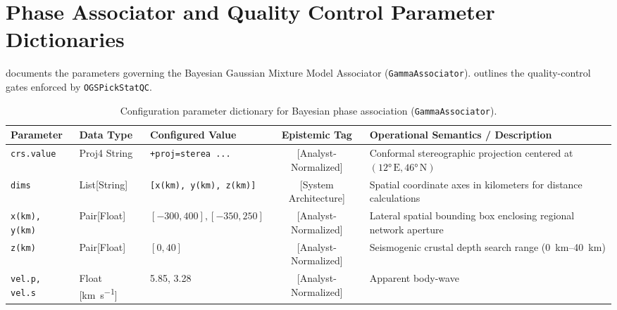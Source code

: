 \section{Phase Associator and Quality Control Parameter Dictionaries}
\label{sec:app_assoc_qc_params}

 documents the parameters
governing the Bayesian Gaussian Mixture Model Associator
(\texttt{GammaAssociator}). 
outlines the quality-control gates enforced by \texttt{OGSPickStatQC}.

\begin{landscape}
  \begin{table}[htbp]
    \centering
    \small
    \caption{Configuration parameter dictionary for Bayesian phase
    association (\texttt{GammaAssociator}).}
    \label{tab:app_gamma_dictionary}
    \begin{threeparttable}
      \begin{tabularx}{\linewidth}{l l l c >{\raggedright\arraybackslash}X}
        \toprule
        \textbf{Parameter} & \textbf{Data Type} & \textbf{Configured
        Value} & \textbf{Epistemic Tag} & \textbf{Operational
        Semantics / Description} \\
        \midrule
        \texttt{crs.value} & Proj4 String & \texttt{+proj=sterea ...}
        & [Analyst-Normalized] & Conformal stereographic projection
        centered at $(\ang{12}\,\mathrm{E}, \ang{46}\,\mathrm{N})$ \\
        \texttt{dims} & List[String] & \texttt{[x(km), y(km), z(km)]}
        & [System Architecture] & Spatial coordinate axes in
        kilometers for distance calculations \\
        \texttt{x(km), y(km)} & Pair[Float] & $[\num{-300},
        \num{400}], [\num{-350},
        \num{250}]$ & [Analyst-Normalized] & Lateral spatial bounding box
        enclosing regional network aperture \\
        \texttt{z(km)} & Pair[Float] & $[\num{0}, \num{40}]$ &
        [Analyst-Normalized] & Seismogenic crustal depth search range
        (\qtyrange{0}{40}{\kilo\meter}) \\
        \texttt{vel.p, vel.s} & Float [\unit{\kilo\meter\per\second}] &
        \num{5.85}, \num{3.28} & [Analyst-Normalized] & Apparent body-wave

\end{tabularx}
\end{threeparttable}
\end{table}
\end{landscape}
